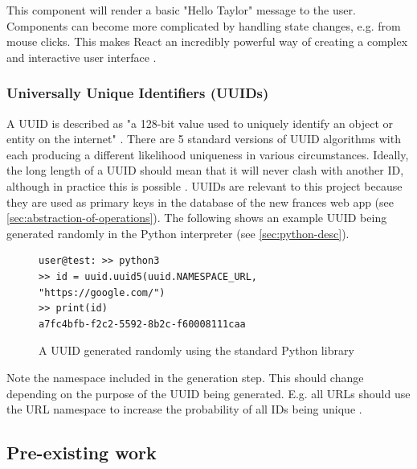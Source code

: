 \documentclass[12pt, letterpaper]{article}
\begin{document}
\begin{flushleft}
This component will render a basic "Hello Taylor" message to the user. Components can become more complicated by handling state changes, e.g. from mouse clicks. This makes React an incredibly powerful way of creating a complex and interactive user interface \cite{react-desc}.
\end{flushleft}

\subsubsection{Universally Unique Identifiers (UUIDs)}\label{sec:uuids-desc}

\begin{flushleft}
A UUID is described as "a 128-bit value used to uniquely identify an object or entity on the internet" \cite{uuids-what-is}. There are 5 standard versions of UUID algorithms with each producing a different likelihood uniqueness in various circumstances. Ideally, the long length of a UUID should mean that it will never clash with another ID, although in practice this is possible \cite{uuids-what-is}. UUIDs are relevant to this project because they are used as primary keys in the database of the new frances web app (see \ref{sec:abstraction-of-operations}). The following shows an example UUID being generated randomly in the Python interpreter (see \ref{sec:python-desc}).
\end{flushleft}

\begin{flushleft}
\begin{figure}[H]
\begin{verbatim}
user@test: >> python3
>> id = uuid.uuid5(uuid.NAMESPACE_URL, "https://google.com/")
>> print(id)
a7fc4bfb-f2c2-5592-8b2c-f60008111caa
\end{verbatim}
\caption{A UUID generated randomly using the standard Python library}
\end{figure}
\end{flushleft}

\begin{flushleft}
Note the namespace included in the generation step. This should change depending on the purpose of the UUID being generated. E.g. all URLs should use the URL namespace to increase the probability of all IDs being unique \cite{uuids-what-is}.
\end{flushleft}

\subsection{Pre-existing work}
\end{document}
